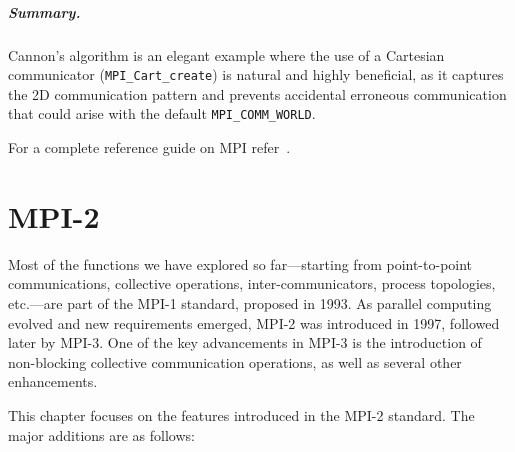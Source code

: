 \documentclass[12pt]{book}
\begin{document}
\paragraph{Summary.}  
Cannon's algorithm is an elegant example where the use of a Cartesian communicator (\texttt{MPI\_Cart\_create}) is natural and highly beneficial, as it captures the 2D communication pattern and prevents accidental erroneous communication that could arise with the default \texttt{MPI\_COMM\_WORLD}.

For a complete reference guide on MPI refer~\cite{snir1998mpi}.




\chapter{MPI-2}

Most of the functions we have explored so far---starting from point-to-point communications, collective operations, inter-communicators, process topologies, etc.---are part of the MPI-1 standard, proposed in 1993. As parallel computing evolved and new requirements emerged, MPI-2 was introduced in 1997, followed later by MPI-3. One of the key advancements in MPI-3 is the introduction of non-blocking collective communication operations, as well as several other enhancements.

This chapter focuses on the features introduced in the MPI-2 standard. The major additions are as follows:
\end{document}
